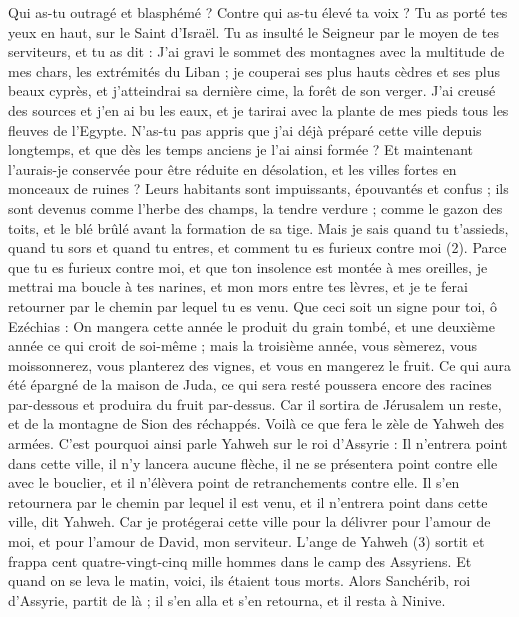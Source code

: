 \begin{multicols}{2}
{Qui as-tu outragé et blasphémé ? Contre qui as-tu élevé ta voix ? Tu as porté tes yeux en haut, sur le Saint d'Israël.
Tu as insulté le Seigneur par le moyen de tes serviteurs, et tu as dit : J’ai gravi le sommet des montagnes avec la multitude de mes chars, les extrémités du Liban ; je couperai ses plus hauts cèdres et ses plus beaux cyprès, et j’atteindrai sa dernière cime, la forêt de son verger.
J'ai creusé des sources et j'en ai bu les eaux, et je tarirai avec la plante de mes pieds tous les fleuves de l’Egypte.
N'as-tu pas appris que j’ai déjà préparé cette ville depuis longtemps, et que dès les temps anciens je l'ai ainsi formée ? Et maintenant l'aurais-je conservée pour être réduite en désolation, et les villes fortes en monceaux de ruines ?
Leurs habitants sont impuissants, épouvantés et confus ; ils sont devenus comme l'herbe des champs, la tendre verdure ; comme le gazon des toits, et le blé brûlé avant la formation de sa tige.
Mais je sais quand tu t’assieds, quand tu sors et quand tu entres, et comment tu es furieux contre moi (2).
Parce que tu es furieux contre moi, et que ton insolence est montée à mes oreilles, je mettrai ma boucle à tes narines, et mon mors entre tes lèvres, et je te ferai retourner par le chemin par lequel tu es venu.
Que ceci soit un signe pour toi, ô Ezéchias : On mangera cette année le produit du grain tombé, et une deuxième année ce qui croit de soi-même ; mais la troisième année, vous sèmerez, vous moissonnerez, vous planterez des vignes, et vous en mangerez le fruit.
Ce qui aura été épargné de la maison de Juda, ce qui sera resté poussera encore des racines par-dessous et produira du fruit par-dessus.
Car il sortira de Jérusalem un reste, et de la montagne de Sion des réchappés. Voilà ce que fera le zèle de Yahweh des armées.
C'est pourquoi ainsi parle Yahweh sur le roi d’Assyrie : Il n'entrera point dans cette ville, il n'y lancera aucune flèche, il ne se présentera point contre elle avec le bouclier, et il n’élèvera point de retranchements contre elle.
Il s'en retournera par le chemin par lequel il est venu, et il n'entrera point dans cette ville, dit Yahweh.
Car je protégerai cette ville pour la délivrer pour l'amour de moi, et pour l'amour de David, mon serviteur.
L’ange de Yahweh (3) sortit et frappa cent quatre-vingt-cinq mille hommes dans le camp des Assyriens. Et quand on se leva le matin, voici, ils étaient tous morts.
Alors Sanchérib, roi d’Assyrie, partit de là ; il s'en alla et s'en retourna, et il resta à Ninive.
}
\end{multicols}
